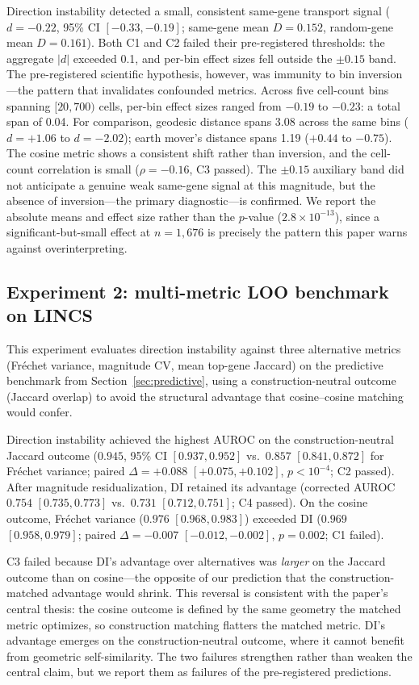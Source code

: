 \documentclass[11pt]{article}
\begin{document}
Direction instability detected a small, consistent same-gene transport
signal ($d = -0.22$, 95\% CI $[-0.33, -0.19]$; same-gene mean $D =
0.152$, random-gene mean $D = 0.161$). Both C1 and C2 failed their pre-registered thresholds: the
aggregate $|d|$ exceeded 0.1, and per-bin effect sizes fell outside the
$\pm 0.15$ band. The pre-registered scientific hypothesis, however,
was immunity to bin inversion---the pattern that invalidates confounded
metrics. Across five cell-count bins spanning $[20, 700)$ cells,
per-bin effect sizes ranged from $-0.19$ to $-0.23$: a total span of
0.04. For comparison, geodesic distance spans 3.08 across the same bins
($d = +1.06$ to $d = -2.02$); earth mover's distance spans 1.19
($+0.44$ to $-0.75$). The cosine metric shows a consistent shift
rather than inversion, and the cell-count correlation is small ($\rho =
-0.16$, C3 passed). The $\pm 0.15$ auxiliary band did not anticipate a
genuine weak same-gene signal at this magnitude, but the absence of
inversion---the primary diagnostic---is confirmed.
We report the absolute means and effect size rather than the $p$-value
($2.8 \times 10^{-13}$), since a significant-but-small effect at $n =
1{,}676$ is precisely the pattern this paper warns against
overinterpreting.

\subsection{Experiment 2: multi-metric LOO benchmark on LINCS}
\label{sec:benchmark}

This experiment evaluates direction instability against three alternative
metrics (Fr\'{e}chet variance, magnitude CV, mean top-gene Jaccard) on
the predictive benchmark from Section~\ref{sec:predictive}, using a
construction-neutral outcome (Jaccard overlap) to avoid the structural
advantage that cosine--cosine matching would confer.

Direction instability achieved the highest AUROC on the
construction-neutral Jaccard outcome ($0.945$, 95\% CI $[0.937, 0.952]$
vs.\ $0.857$ $[0.841, 0.872]$ for Fr\'{e}chet variance; paired
$\Delta = +0.088$ $[+0.075, +0.102]$, $p < 10^{-4}$; C2 passed). After
magnitude residualization, DI retained its advantage (corrected AUROC
$0.754$ $[0.735, 0.773]$ vs.\ $0.731$ $[0.712, 0.751]$; C4 passed). On
the cosine outcome, Fr\'{e}chet variance ($0.976$ $[0.968, 0.983]$)
exceeded DI ($0.969$ $[0.958, 0.979]$; paired $\Delta = -0.007$
$[-0.012, -0.002]$, $p = 0.002$; C1 failed).

C3 failed because DI's advantage over alternatives was \emph{larger} on
the Jaccard outcome than on cosine---the opposite of our prediction that
the construction-matched advantage would shrink. This reversal is
consistent with the paper's central thesis: the cosine outcome is
defined by the same geometry the matched metric optimizes, so
construction matching flatters the matched metric. DI's advantage
emerges on the construction-neutral outcome, where it cannot benefit
from geometric self-similarity. The two failures strengthen rather than
weaken the central claim, but we report them as failures of the
pre-registered predictions.
\end{document}
